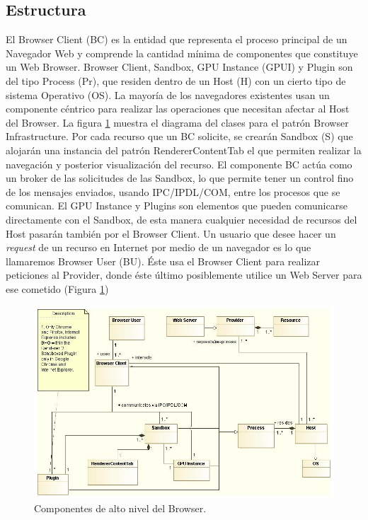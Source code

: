 \subsection{Estructura}
El Browser Client (BC) es la entidad que representa el proceso principal de un Navegador Web y comprende la cantidad mínima de componentes que constituye un Web Browser. Browser Client, Sandbox, GPU Instance (GPUI) y Plugin son del tipo Process (Pr), que residen dentro de un Host (H) con un cierto tipo de sistema Operativo (OS). La mayoría de los navegadores existentes usan un componente céntrico para realizar las operaciones que necesitan afectar al Host del Browser. La figura \ref{fig:BIPatt} muestra el diagrama del clases para el patrón Browser Infrastructure. Por cada recurso que un BC solicite, se crearán Sandbox (S) que alojarán una instancia del patrón RendererContentTab el que permiten realizar la navegación y posterior visualización del recurso.
El componente BC actúa como un broker de las solicitudes de las Sandbox, lo que permite tener un control fino de los mensajes enviados, usando IPC/IPDL/COM, entre los procesos que se comunican. El GPU Instance y Plugins son elementos que pueden comunicarse directamente con el Sandbox, de esta manera cualquier necesidad de recursos del Host pasarán también por el Browser Client. 
Un usuario que desee hacer un \textit{request} de un recurso en Internet por medio de un navegador es lo que llamaremos Browser User (BU). Éste usa el Browser Client para realizar peticiones al Provider, donde éste último posiblemente utilice un Web Server para ese cometido (Figura \ref{fig:BIPatt})

	    \begin{figure}[h!t]
	        \centering
	        \includegraphics[scale=0.45]{figures/chap4/browserInfraPattern.jpg}
	        \caption{Componentes de alto nivel del Browser.}
	        \label{fig:BIPatt}
	    \end{figure}

